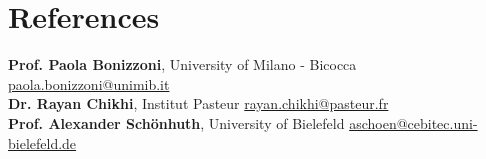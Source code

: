 \documentclass[letterpaper,11pt]{article}
\begin{document}
\section{References}
 \begin{itemize}[leftmargin=0.15in, label={}]
    \small{\item{
     \textbf{Prof. Paola Bonizzoni}{, University of Milano - Bicocca \hfill \href{mailto:paola.bonizzoni@unimib.it}{paola.bonizzoni@unimib.it}}\\
     \textbf{Dr. Rayan Chikhi}{, Institut Pasteur \hfill \href{mailto:rayan.chikhi@pasteur.fr}{rayan.chikhi@pasteur.fr}}\\
     \textbf{Prof. Alexander Sch\"{o}nhuth}{, University of Bielefeld \hfill \href{mailto:aschoen@cebitec.uni-bielefeld.de}{aschoen@cebitec.uni-bielefeld.de}}
    }}
 \end{itemize}

\end{document}
